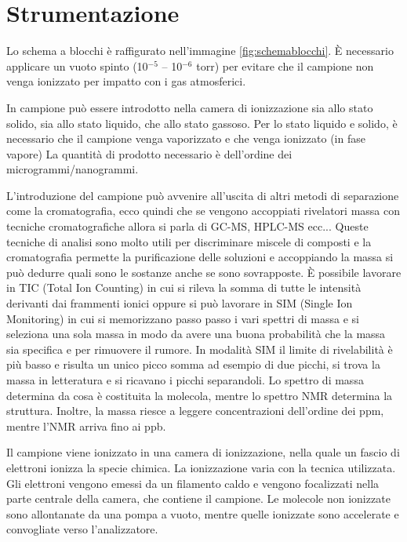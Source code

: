 \section{Strumentazione}
Lo schema a blocchi è raffigurato nell'immagine \ref{fig:schemablocchi}.
È necessario applicare un vuoto spinto (10$^{-5}$ – 10$^{-6}$ torr) per evitare che il campione non venga ionizzato per impatto con i gas atmosferici.


In campione può essere introdotto nella camera di ionizzazione sia allo stato solido, sia allo stato liquido, che allo stato gassoso.
Per lo stato liquido e solido, è necessario che il campione venga vaporizzato e che venga ionizzato (in fase vapore)
La quantità di prodotto necessario è dell'ordine dei microgrammi/nanogrammi.

L'introduzione del campione può avvenire all'uscita di altri metodi di separazione come la cromatografia, ecco quindi che se vengono accoppiati rivelatori massa con tecniche cromatografiche allora si parla di GC-MS, HPLC-MS ecc...
Queste tecniche di analisi sono molto utili per discriminare miscele di composti e la cromatografia permette la purificazione delle soluzioni e accoppiando la massa si può dedurre quali sono le sostanze anche se sono sovrapposte.
È possibile lavorare in TIC (Total Ion Counting) in cui si rileva la somma di tutte le intensità derivanti dai frammenti ionici oppure si può lavorare in SIM (Single Ion Monitoring) in cui si memorizzano passo passo i vari spettri di massa e si seleziona una sola massa in modo da avere una buona probabilità che la massa sia specifica e per rimuovere il rumore.
In modalità SIM il limite di rivelabilità è più basso e risulta un unico picco somma ad esempio di due picchi, si trova la massa in letteratura e si ricavano i picchi separandoli.
Lo spettro di massa determina da cosa è costituita la molecola, mentre lo spettro NMR determina la struttura. Inoltre, la massa riesce a leggere concentrazioni dell'ordine dei ppm, mentre l’NMR arriva fino ai ppb.

Il campione viene ionizzato in una camera di ionizzazione, nella quale un fascio di elettroni ionizza la specie chimica. La ionizzazione varia con la tecnica utilizzata.
Gli elettroni vengono emessi da un filamento caldo e vengono focalizzati nella parte centrale della camera, che contiene il campione.
Le molecole non ionizzate sono allontanate da una pompa a vuoto, mentre quelle ionizzate sono accelerate e convogliate verso l'analizzatore.


